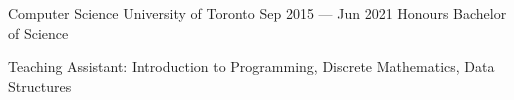 
\begin{cventries}
  \cventry
    {Computer Science}
    {University of Toronto}
    {}
    {Sep 2015 --- Jun 2021}
    {Honours Bachelor of Science}
    {
      \begin{cvitems}
        \item {Teaching Assistant: Introduction to Programming, Discrete Mathematics, Data Structures}
      \end{cvitems}
    }
\end{cventries}
